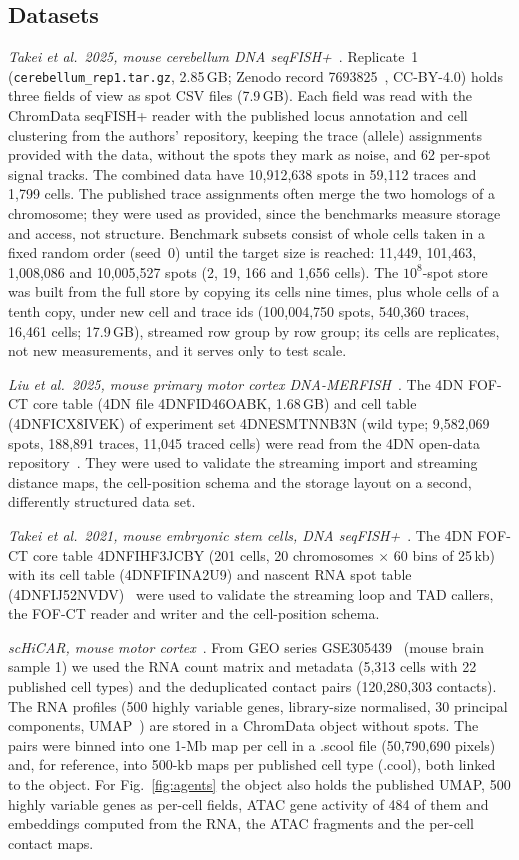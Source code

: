 \documentclass[11pt]{article}
\newcommand{\pkg}[1]{\texttt{#1}}
\begin{document}
\subsection*{Datasets}
\textit{Takei et al.\ 2025, mouse cerebellum DNA seqFISH+}~\citep{takei2025}.
Replicate~1 (\pkg{cerebellum\_rep1.tar.gz}, 2.85\,GB; Zenodo record 7693825~\citep{takei2025zenodo}, CC-BY-4.0) holds three fields of view as spot CSV files (7.9\,GB).
Each field was read with the ChromData seqFISH+ reader with the published locus annotation and cell clustering from the authors' repository, keeping the trace (allele) assignments provided with the data, without the spots they mark as noise, and 62 per-spot signal tracks.
The combined data have 10,912,638 spots in 59,112 traces and 1,799 cells.
The published trace assignments often merge the two homologs of a chromosome; they were used as provided, since the benchmarks measure storage and access, not structure.
Benchmark subsets consist of whole cells taken in a fixed random order (seed~0) until the target size is reached: 11,449, 101,463, 1,008,086 and 10,005,527 spots (2, 19, 166 and 1,656 cells).
The $10^{8}$-spot store was built from the full store by copying its cells nine times, plus whole cells of a tenth copy, under new cell and trace ids (100,004,750 spots, 540,360 traces, 16,461 cells; 17.9\,GB), streamed row group by row group; its cells are replicates, not new measurements, and it serves only to test scale.

\textit{Liu et al.\ 2025, mouse primary motor cortex DNA-MERFISH}~\citep{liu2025}.
The 4DN FOF-CT core table (4DN file 4DNFID46OABK, 1.68\,GB) and cell table (4DNFICX8IVEK) of experiment set 4DNESMTNNB3N (wild type; 9,582,069 spots, 188,891 traces, 11,045 traced cells) were read from the 4DN open-data repository~\citep{liu2025data}.
They were used to validate the streaming import and streaming distance maps, the cell-position schema and the storage layout on a second, differently structured data set.

\textit{Takei et al.\ 2021, mouse embryonic stem cells, DNA seqFISH+}~\citep{takei2021}.
The 4DN FOF-CT core table 4DNFIHF3JCBY (201 cells, 20 chromosomes $\times$ 60 bins of 25\,kb) with its cell table (4DNFIFINA2U9) and nascent RNA spot table (4DNFIJ52NVDV)~\citep{takei2021data} were used to validate the streaming loop and TAD callers, the FOF-CT reader and writer and the cell-position schema.

\textit{scHiCAR, mouse motor cortex}~\citep{schicar}.
From GEO series GSE305439~\citep{schicargeo} (mouse brain sample 1) we used the RNA count matrix and metadata (5,313 cells with 22 published cell types) and the deduplicated contact pairs (120,280,303 contacts).
The RNA profiles (500 highly variable genes, library-size normalised, 30 principal components, UMAP~\citep{umap}) are stored in a ChromData object without spots.
The pairs were binned into one 1-Mb map per cell in a .scool file (50,790,690 pixels) and, for reference, into 500-kb maps per published cell type (.cool), both linked to the object.
For Fig.~\ref{fig:agents} the object also holds the published UMAP, 500 highly variable genes as per-cell fields, ATAC gene activity of 484 of them and embeddings computed from the RNA, the ATAC fragments and the per-cell contact maps.
\end{document}
